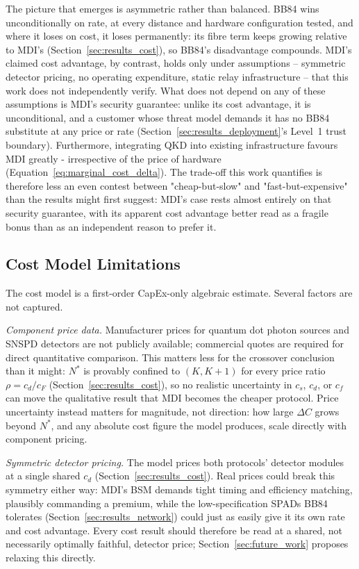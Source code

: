 \documentclass[12pt]{article}
\begin{document}
The picture that emerges is asymmetric rather than balanced. BB84 wins unconditionally on rate, at every distance and hardware configuration tested, and where it loses on cost, it loses permanently: its fibre term keeps growing relative to MDI's (Section~\ref{sec:results_cost}), so BB84's disadvantage compounds. MDI's claimed cost advantage, by contrast, holds only under assumptions -- symmetric detector pricing, no operating expenditure, static relay infrastructure -- that this work does not independently verify. What does not depend on any of these assumptions is MDI's security guarantee: unlike its cost advantage, it is unconditional, and a customer whose threat model demands it has no BB84 substitute at any price or rate (Section~\ref{sec:results_deployment}'s Level~1 trust boundary). Furthermore, integrating QKD into existing infrastructure favours MDI greatly - irrespective of the price of hardware (Equation~\ref{eq:marginal_cost_delta}). The trade-off this work quantifies is therefore less an even contest between "cheap-but-slow" and "fast-but-expensive" than the results might first suggest: MDI's case rests almost entirely on that security guarantee, with its apparent cost advantage better read as a fragile bonus than as an independent reason to prefer it.

\subsection{Cost Model Limitations}
\label{sec:cost_model_limitations}

The cost model is a first-order CapEx-only algebraic estimate. Several factors are not captured.

\textit{Component price data.} Manufacturer prices for quantum dot photon sources and SNSPD detectors are not publicly available; commercial quotes are required for direct quantitative comparison. This matters less for the crossover conclusion than it might: $N^*$ is provably confined to $(K,K{+}1)$ for every price ratio $\rho=c_d/c_F$ (Section~\ref{sec:results_cost}), so no realistic uncertainty in $c_s$, $c_d$, or $c_f$ can move the qualitative result that MDI becomes the cheaper protocol. Price uncertainty instead matters for magnitude, not direction: how large $\Delta C$ grows beyond $N^*$, and any absolute cost figure the model produces, scale directly with component pricing.

\textit{Symmetric detector pricing.} The model prices both protocols' detector modules at a single shared $c_d$ (Section~\ref{sec:results_cost}). Real prices could break this symmetry either way: MDI's BSM demands tight timing and efficiency matching, plausibly commanding a premium, while the low-specification SPADs BB84 tolerates (Section~\ref{sec:results_network}) could just as easily give it its own rate and cost advantage. Every cost result should therefore be read at a shared, not necessarily optimally faithful, detector price; Section~\ref{sec:future_work} proposes relaxing this directly.
\end{document}
